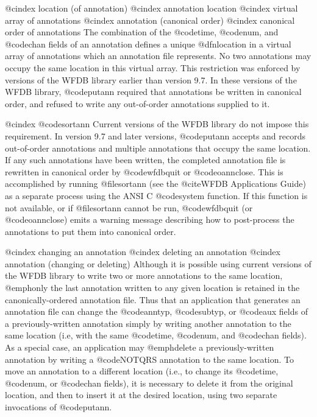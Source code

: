 {{{{{{{{{{{{{{@cindex location (of annotation)
@cindex annotation location
@cindex virtual array of annotations
@cindex annotation (canonical order)
@cindex canonical order of annotations
The combination of the @code{time}, @code{num}, and @code{chan} fields of an
annotation defines a unique @dfn{location} in a virtual array of
annotations which an annotation file represents.  No two annotations may
occupy the same location in this virtual array.  This restriction was
enforced by versions of the WFDB library earlier than version 9.7.  In
these versions of the WFDB library, @code{putann} required that
annotations be written in canonical order, and refused to write any
out-of-order annotations supplied to it.

@cindex @code{sortann}
Current versions of the WFDB library do not impose this requirement.  In version
9.7 and later versions, @code{putann} accepts and records out-of-order
annotations and multiple annotations that occupy the same location.  If any
such annotations have been written, the completed annotation file is rewritten
in canonical order by @code{wfdbquit} or @code{oannclose}.  This is accomplished
by running @file{sortann} (see the @cite{WFDB Applications
Guide}) as a separate process using the ANSI C @code{system} function.  If this
function is not available, or if @file{sortann} cannot be run, @code{wfdbquit}
(or @code{oannclose}) emits a warning message describing how to post-process
the annotations to put them into canonical order.

@cindex changing an annotation
@cindex deleting an annotation
@cindex annotation (changing or deleting)
Although it is possible using current versions of the WFDB library to write two
or more annotations to the same location, @emph{only the last annotation
written to any given location is retained} in the canonically-ordered
annotation file.  Thus that an application that generates an annotation file
can change the @code{anntyp}, @code{subtyp}, or @code{aux} fields of a
previously-written annotation simply by writing another annotation to the same
location (i.e, with the same @code{time}, @code{num}, and @code{chan} fields).
As a special case, an application may @emph{delete} a previously-written
annotation by writing a @code{NOTQRS} annotation to the same location.  To move
an annotation to a different location (i.e., to change its @code{time},
@code{num}, or @code{chan} fields), it is necessary to delete it from the
original location, and then to insert it at the desired location, using two
separate invocations of @code{putann}.

}}}}}}}}}}}}}}
